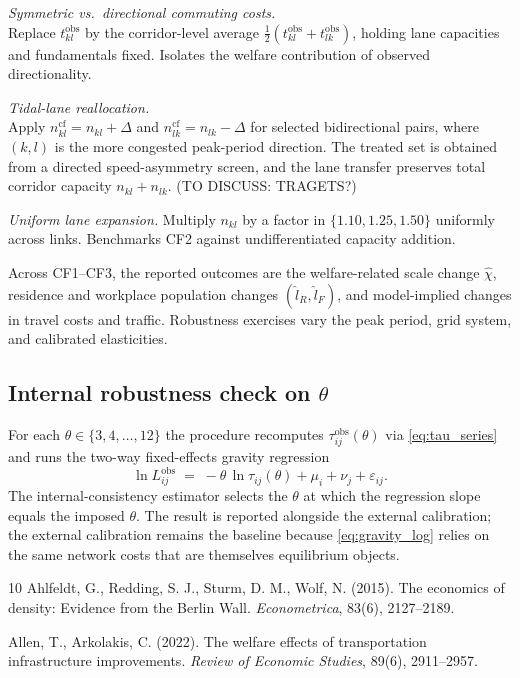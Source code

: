 \documentclass[12pt]{article}
\newcommand{\tkl}{t_{kl}}
\newcommand{\tijk}{\tau_{ij}}
\newcommand{\obs}{\mathrm{obs}}
\newcommand{\cf}{\mathrm{cf}}
\begin{document}
\begin{description}[leftmargin=2.5em,itemsep=0.25em]
\item[CF1.] \emph{Symmetric vs.\ directional commuting costs.} \\ 
  Replace $\tkl^{\obs}$ by the corridor-level average
  $\tfrac12(\tkl^{\obs}+t_{lk}^{\obs})$, holding lane capacities and
  fundamentals fixed.  Isolates the welfare contribution of observed
  directionality.
\item[CF2.] \emph{Tidal-lane reallocation.}  \\
  Apply
  $n_{kl}^{\cf}=n_{kl}+\Delta$ and
  $n_{lk}^{\cf}=n_{lk}-\Delta$ for selected bidirectional pairs,
  where $(k,l)$ is the more congested peak-period direction.  The
  treated set is obtained from a directed speed-asymmetry screen, and
  the lane transfer preserves total corridor capacity
  $n_{kl}+n_{lk}$. (TO DISCUSS: TRAGETS?)
\item[CF3.] \emph{Uniform lane expansion.} Multiply $n_{kl}$ by a
  factor in $\{1.10,1.25,1.50\}$ uniformly across links.  Benchmarks
  CF2 against undifferentiated capacity addition.
\end{description}
Across CF1--CF3, the reported outcomes are the welfare-related
scale change $\hat\chi$, residence and workplace population changes
$(\hat l_R,\hat l_F)$, and model-implied changes in travel costs and
traffic.  Robustness exercises vary the peak period, grid system,
and calibrated elasticities.

\subsection{Internal robustness check on $\theta$}\label{ssec:theta_check}

For each $\theta\in\{3,4,\dots,12\}$ the procedure recomputes
$\tijk^{\obs}(\theta)$ via \eqref{eq:tau_series} and runs the
two-way fixed-effects gravity regression
\begin{equation}
  \ln L_{ij}^{\obs}\;=\;-\theta\,\ln\tijk(\theta)+\mu_i+\nu_j+\varepsilon_{ij}.
  \label{eq:gravity_log}
\end{equation}
The internal-consistency estimator selects the $\theta$ at which the
regression slope equals the imposed $\theta$.  The result is
reported alongside the external calibration; the external calibration
remains the baseline because \eqref{eq:gravity_log} relies on the
same network costs that are themselves equilibrium objects.

\begin{thebibliography}{10}
Ahlfeldt, G., Redding, S. J., Sturm, D. M., Wolf, N. (2015). The
economics of density: Evidence from the Berlin Wall.
\emph{Econometrica}, 83(6), 2127--2189.

Allen, T., Arkolakis, C. (2022). The welfare effects of transportation
infrastructure improvements. \emph{Review of Economic Studies},
89(6), 2911--2957.

\end{thebibliography}
\end{document}
